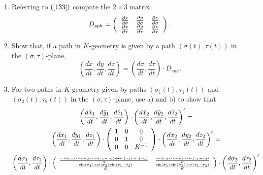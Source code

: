 \documentclass{ximera}
\begin{document}
\begin{exercise}\label{3333} 
\begin{enumerate}
\item Referring to $\left(\ref{133}\right)$ compute the $2\times3$
  matrix
\[
D_{sph}=\left(
\begin{array}
[c]{ccc}%
\frac{\partial x}{\partial \sigma} & \frac{\partial y}{\partial \sigma} & \frac{\partial z}{\partial \sigma}\\
\frac{\partial x}{\partial \tau} & \frac{\partial y}{\partial \tau} & \frac{\partial z}{\partial \tau}%
\end{array}
\right)  .
\]


\item  Show that, if a path in $K$-geometry is given by a path $\left(
\sigma\left(  t\right)  ,\tau\left(  t\right)  \right)  $ in the $\left(
\sigma,\tau\right)  $-plane,%
\[
\left(  \frac{dx}{dt},\frac{dy}{dt},\frac{dz}{dt}\right)  =\left(
\frac{d\sigma}{dt},\frac{d\tau}{dt}\right)  \cdot D_{sph}.
\]


\item For two paths in $K$-geometry given by paths $\left(  \sigma_{1}\left(
t\right)  ,\tau_{1}\left(  t\right)  \right)  $ and $\left(  \sigma_{2}\left(
t\right)  ,\tau_{2}\left(  t\right)  \right)  $ in the $\left(  \sigma
,\tau\right)  $-plane, use a) and b) to show that
\begin{gather*}
\left(  \frac{d\hat{x}_{1}}{dt},\frac{d\hat{y}_{1}}{dt},\frac{d\hat{z}_{1}%
}{dt}\right)  \cdot\left(  \frac{d\hat{x}_{2}}{dt},\frac{d\hat{y}_{2}}{dt}%
,\frac{d\hat{z}_{2}}{dt}\right)  ^{t}=\\
\left(  \frac{dx_{1}}{dt},\frac{dy_{1}}{dt},\frac{dz_{1}}{dt}\right)
\cdot\left(
\begin{array}
[c]{ccc}%
1 & 0 & 0\\
0 & 1 & 0\\
0 & 0 & K^{-1}%
\end{array}
\right)  \cdot\left(  \frac{dx_{2}}{dt},\frac{dy_{2}}{dt},\frac{dz_{2}}%
{dt}\right)  ^{t}=\\
\left(  \frac{d\sigma_{1}}{dt},\frac{d\tau_{1}}{dt}\right)  \cdot
\left({\tiny
\begin{array}{cc}
 \frac{\cos \left(\sigma _1\right) \cos \left(\sigma _2\right) \cos
   \left(\tau _1-\tau _2\right)+\sin \left(\sigma _1\right) \sin
   \left(\sigma _2\right)}{K} & \frac{\sin \left(\sigma _2\right)
   \cos \left(\sigma _1\right) \sin \left(\tau _1-\tau
   _2\right)}{K} \\
 -\frac{\sin \left(\sigma _1\right) \cos \left(\sigma _2\right)
   \sin \left(\tau _1-\tau _2\right)}{K} & \frac{\sin \left(\sigma
   _1\right) \sin \left(\sigma _2\right) \cos \left(\tau _1-\tau
   _2\right)}{K} \\
\end{array}}
\right)
\cdot\left(  \frac{d\sigma_{2}}{dt},\frac{d\tau_{2}}{dt}\right)  ^{t}%
\end{gather*}


\end{enumerate}
\end{exercise}
\end{document}
